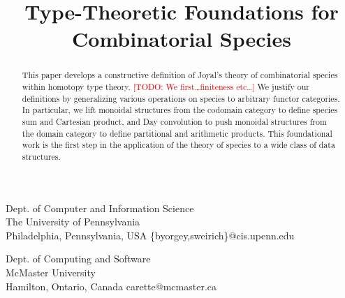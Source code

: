 \documentclass[preprint,authoryear]{sigplanconf}
\newcommand{\todo}[1]{\textcolor{red}{[TODO: #1]}}
\newcommand{\todo}[1]{}
\theoremstyle{definition}
\theoremstyle{remark}
\begin{document}
\setlength{\pdfpageheight}{\paperheight}
\setlength{\pdfpagewidth}{\paperwidth}



\exclusivelicense                %



\title{Type-Theoretic Foundations for Combinatorial Species}

{Dept. of Computer and Information Science\\ The University of Pennsylvania\\
Philadelphia, Pennsylvania, USA}
{\{byorgey,sweirich\}@cis.upenn.edu}

{Dept. of Computing and Software\\ McMaster University\\
Hamilton, Ontario, Canada}
{carette@mcmaster.ca}

\maketitle

\begin{abstract}
  This paper develops a constructive definition of Joyal's theory of
  combinatorial species within homotopy type theory. \todo{We
    first\dots finiteness etc\dots}
  We justify our definitions
  by generalizing various operations on species to arbitrary functor
  categories. In particular, we lift monoidal structures from the codomain
  category to define species sum and
  Cartesian product, and Day convolution to push monoidal structures from
  the domain category to define partitional and arithmetic
  products. This foundational work is the first step in the application of the
  theory of species to a wide class of data structures.
\end{abstract}
\end{document}
